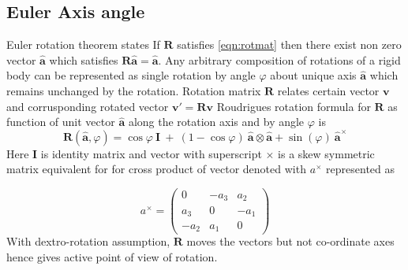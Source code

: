 \subsection{Euler Axis angle}

Euler rotation theorem states If $ \mathbf{R}$ satisfies \autoref{eqn:rotmat} then there exist non zero vector $ \hat{\mathbf{a}}$ which satisfies $ \mathbf{R\hat{a}} =\hat{\mathbf{a}}$. Any arbitrary composition of rotations of a rigid body can be represented as single rotation by angle $ \varphi $ about unique axis $ \hat{\mathbf{a}}$ which remains unchanged by the rotation.\cite{eulerAxis} Rotation matrix $ \mathbf{R}$ relates certain vector $ \mathbf{v}$ and corrusponding rotated vector $ \mathbf{v'} =\mathbf{Rv}$ Roudrigues rotation formula for $ \mathbf{R}$ as function of unit vector $ \hat{\mathbf{a}}$ along the rotation axis and by angle $ \varphi $ is
\begin{equation}
\mathbf{R}(\hat{\mathbf{a}} ,\varphi ) =\cos \varphi \ \mathbf{I} \ +\ ( 1-\cos \varphi ) \ \hat{\mathbf{a}} \otimes \hat{\mathbf{a}} +\sin( \varphi ) \ \hat{\mathbf{a}}^{\times }
\end{equation}
Here $\mathbf{I}$ is identity matrix and vector with superscript $\times$ is a skew symmetric matrix equivalent for for cross product of vector denoted with $a^{\times}$ represented as

\begin{equation*}
a^{\times } =\begin{pmatrix}
0 & -a_{3} & a_{2}\\
a_{3} & 0 & -a_{1}\\
-a_{2} & a_{1} & 0
\end{pmatrix}
\end{equation*}
With dextro-rotation assumption, $ \mathbf{R}$ moves the vectors but not co-ordinate axes hence gives active point of view of rotation.

